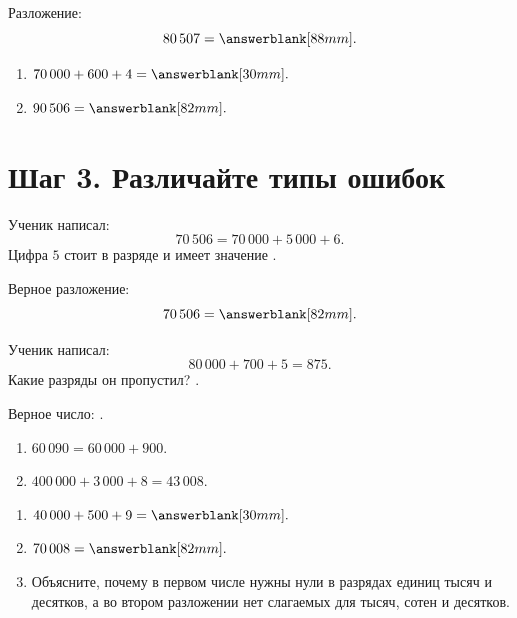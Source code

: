 Разложение:
\[
  80\,507=\answerblank[88mm].
\]

\begin{practicebox}
  \begin{enumerate}[label=\textbf{\arabic*.}]
    \item \(70\,000+600+4=\answerblank[30mm].\)
    \item \(90\,506=\answerblank[82mm].\)
  \end{enumerate}
\end{practicebox}

\section{Шаг 3. Различайте типы ошибок}

\begin{warningbox}
  Ученик написал:
  \[
    70\,506=70\,000+5\,000+6.
  \]
  Цифра \(5\) стоит в разряде \answerblank[25mm] и имеет значение
  \answerblank[20mm].

  Верное разложение:
  \[
    70\,506=\answerblank[82mm].
  \]
\end{warningbox}

\begin{warningbox}
  Ученик написал:
  \[
    80\,000+700+5=875.
  \]
  Какие разряды он пропустил? \answerblank[70mm].

  Верное число: \answerblank[32mm].
\end{warningbox}

\begin{practicebox}
  \begin{enumerate}[label=\textbf{\arabic*.}]
    \item \(60\,090=60\,000+900.\)
    \item \(400\,000+3\,000+8=43\,008.\)
  \end{enumerate}
\end{practicebox}

\begin{checkpointbox}
  \begin{enumerate}[label=\textbf{\arabic*.}]
    \item \(40\,000+500+9=\answerblank[30mm].\)
    \item \(70\,008=\answerblank[82mm].\)
    \item Объясните, почему в первом числе нужны нули в разрядах единиц тысяч
      и десятков, а во втором разложении нет слагаемых для тысяч, сотен и
      десятков.
  \end{enumerate}
\end{checkpointbox}
